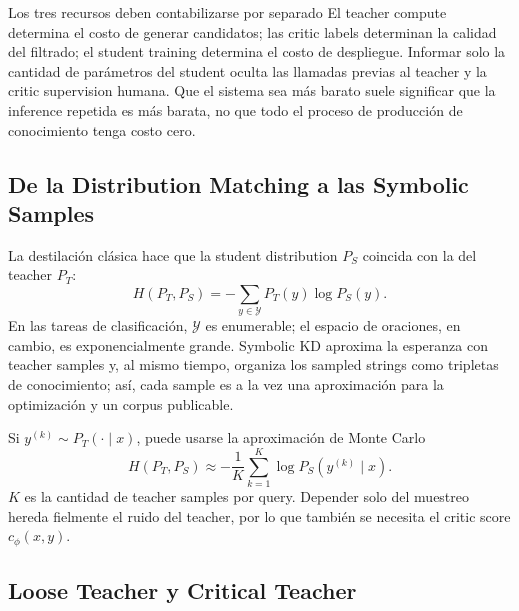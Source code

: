 \begin{importantbox}{Los tres recursos deben contabilizarse por separado}
El teacher compute determina el costo de generar candidatos; las critic labels determinan la calidad del filtrado; el student training determina el costo de despliegue. Informar solo la cantidad de parámetros del student oculta las llamadas previas al teacher y la critic supervision humana. Que el sistema sea más barato suele significar que la inference repetida es más barata, no que todo el proceso de producción de conocimiento tenga costo cero.
\end{importantbox}

\subsection{De la Distribution Matching a las Symbolic Samples}

La destilación clásica hace que la student distribution $P_S$ coincida con la del teacher $P_T$:
\begin{equation}
H(P_T,P_S)=-\sum_{y\in\mathcal{Y}}P_T(y)\log P_S(y).
\end{equation}
En las tareas de clasificación, $\mathcal{Y}$ es enumerable; el espacio de oraciones, en cambio, es exponencialmente grande. Symbolic KD aproxima la esperanza con teacher samples y, al mismo tiempo, organiza los sampled strings como tripletas de conocimiento; así, cada sample es a la vez una aproximación para la optimización y un corpus publicable.


Si $y^{(k)}\sim P_T(\cdot\mid x)$, puede usarse la aproximación de Monte Carlo
\begin{equation}
H(P_T,P_S)\approx -\frac{1}{K}\sum_{k=1}^{K}
\log P_S\!\left(y^{(k)}\mid x\right).
\end{equation}
$K$ es la cantidad de teacher samples por query. Depender solo del muestreo hereda fielmente el ruido del teacher, por lo que también se necesita el critic score $c_\phi(x,y)$.

\subsection{Loose Teacher y Critical Teacher}

